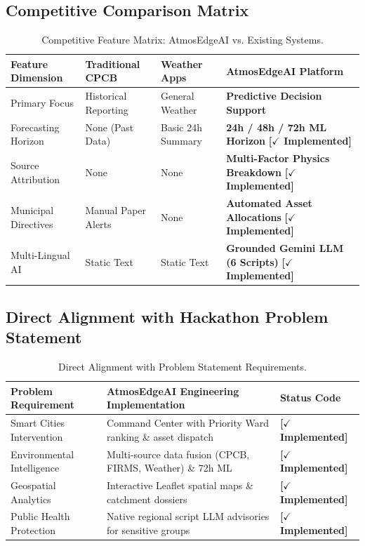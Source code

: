 \documentclass[11pt, a4paper]{article}
\newcommand{\statusimpl}{\textcolor{highlightgreen}{\textbf{[\ensuremath{\checkmark} Implemented]}}}
\begin{document}
\subsection{Competitive Comparison Matrix}

\begin{table}[H]
\centering
\small
{}
\begin{tabularx}{\textwidth}{L{3.6cm} C{2.6cm} C{2.6cm} Y}
\toprule
{}
\textbf{Feature Dimension} & \textbf{Traditional CPCB} & \textbf{Weather Apps} & \textbf{AtmosEdgeAI Platform} \\
\midrule
Primary Focus & Historical Reporting & General Weather & \textbf{Predictive Decision Support} \\
Forecasting Horizon & None (Past Data) & Basic 24h Summary & \textbf{24h / 48h / 72h ML Horizon} \statusimpl \\
Source Attribution & None & None & \textbf{Multi-Factor Physics Breakdown} \statusimpl \\
Municipal Directives & Manual Paper Alerts & None & \textbf{Automated Asset Allocations} \statusimpl \\
Multi-Lingual AI & Static Text & Static Text & \textbf{Grounded Gemini LLM (6 Scripts)} \statusimpl \\
\bottomrule
\end{tabularx}
\caption{Competitive Feature Matrix: AtmosEdgeAI vs. Existing Systems.}
\end{table}

\subsection{Direct Alignment with Hackathon Problem Statement}

\begin{table}[H]
\centering
\small
{}
\begin{tabularx}{\textwidth}{L{4.0cm} Y C{3.0cm}}
\toprule
{}
\textbf{Problem Requirement} & \textbf{AtmosEdgeAI Engineering Implementation} & \textbf{Status Code} \\
\midrule
Smart Cities Intervention & Command Center with Priority Ward ranking \& asset dispatch & \statusimpl \\
Environmental Intelligence & Multi-source data fusion (CPCB, FIRMS, Weather) \& 72h ML & \statusimpl \\
Geospatial Analytics & Interactive Leaflet spatial maps \& catchment dossiers & \statusimpl \\
Public Health Protection & Native regional script LLM advisories for sensitive groups & \statusimpl \\
\bottomrule
\end{tabularx}
\caption{Direct Alignment with Problem Statement Requirements.}
\end{table}
\end{document}
